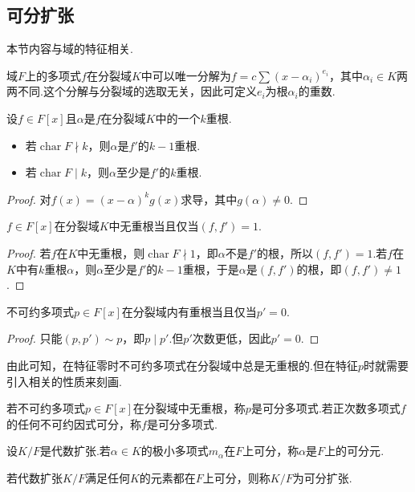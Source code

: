 \subsection{可分扩张}
本节内容与域的特征相关.

\medskip 域$F$上的多项式$f$在分裂域$K$中可以唯一分解为$f=c\sum(x-\alpha_i)^{e_i}$，其中$\alpha_i\in K$两两不同.这个分解与分裂域的选取无关，因此可定义$e_i$为根$\alpha_i$的{\heiti 重数}.

\begin{lemma*}
    设$f\in F[x]$且$\alpha$是$f$在分裂域$K$中的一个$k$重根.
    \begin{itemize}
        \item 若$\operatorname*{char}F\nmid k$，则$\alpha$是$f'$的$k-1$重根.
        \item 若$\operatorname*{char}F\mid  k$，则$\alpha$至少是$f'$的$k$重根.
    \end{itemize}
\end{lemma*}
\begin{proof}
    对$f(x)=(x-\alpha)^kg(x)$求导，其中$g(\alpha)\ne 0$.
\end{proof}
\begin{prop}
    $f\in F[x]$在分裂域$K$中无重根当且仅当$(f,f')=1$.
\end{prop}
\begin{proof}
    若$f$在$K$中无重根，则$\operatorname*{char}F\nmid 1$，即$\alpha$不是$f'$的根，所以$(f,f')=1$.若$f$在$K$中有$k$重根$\alpha$，则$\alpha$至少是$f'$的$k-1$重根，于是$\alpha$是$(f,f')$的根，即$(f,f')\ne 1$.
\end{proof}
\begin{cor*}
    不可约多项式$p\in F[x]$在分裂域内有重根当且仅当$p'=0$.
\end{cor*}
\begin{proof}
    只能$(p,p')\sim p$，即$p\mid p'$.但$p'$次数更低，因此$p'=0$.
\end{proof}

由此可知，在特征零时不可约多项式在分裂域中总是无重根的.但在特征$p$时就需要引入相关的性质来刻画.

\begin{definition}
    若不可约多项式$p\in F[x]$在分裂域中无重根，称$p$是{\heiti 可分多项式}.若正次数多项式$f$的任何不可约因式可分，称$f$是{\heiti 可分多项式}.

    设$K/F$是代数扩张.若$\alpha\in K$的极小多项式$m_\alpha$在$F$上可分，称$\alpha$是$F$上的{\heiti 可分元}.

    若代数扩张$K/F$满足任何$K$的元素都在$F$上可分，则称$K/F$为{\heiti 可分扩张}.
\end{definition}

